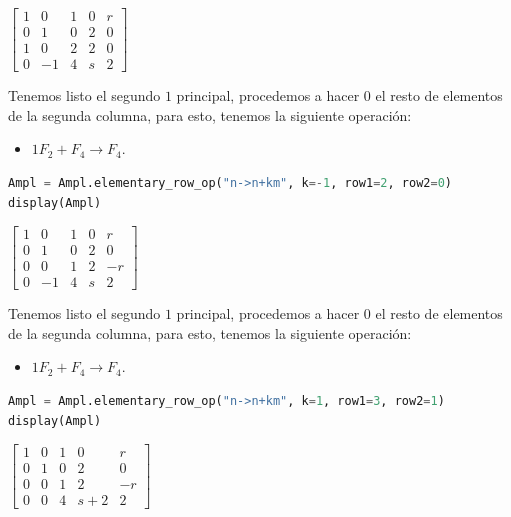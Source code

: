 \documentclass[12pt,a4]{aleph-examen}
\begin{document}
\begin{preguntas}
\begin{respuesta}
\begin{pycodigo}
\begin{ipynbsalida}[2mm]
    $\displaystyle \left[\begin{matrix}1 & 0 & 1 & 0 & r\\0 & 1 & 0 & 2 & 0\\1 & 0 & 2 & 2 & 0\\0 & -1 & 4 & s & 2\end{matrix}\right]$
    \end{ipynbsalida}
\end{pycodigo}
    
Tenemos listo el segundo \(1\) principal, procedemos a hacer \(0\) el
resto de elementos de la segunda columna, para esto, tenemos la
siguiente operación:
\begin{itemize}
    \item \(1F_2+F_4\to F_4\).
\end{itemize}
\begin{pycodigo}
    \begin{ipynbcodigo}\begin{lstlisting}[language=Python]
Ampl = Ampl.elementary_row_op("n->n+km", k=-1, row1=2, row2=0)
display(Ampl)
    \end{lstlisting}\end{ipynbcodigo}
    \begin{ipynbsalida}[2mm]
    $\displaystyle \left[\begin{matrix}1 & 0 & 1 & 0 & r\\0 & 1 & 0 & 2 & 0\\0 & 0 & 1 & 2 & - r\\0 & -1 & 4 & s & 2\end{matrix}\right]$
    \end{ipynbsalida}
\end{pycodigo}

Tenemos listo el segundo \(1\) principal, procedemos a hacer \(0\) el
resto de elementos de la segunda columna, para esto, tenemos la
siguiente operación: 
\begin{itemize}
    \item \(1F_2+F_4\to F_4\).
\end{itemize}
\begin{pycodigo}
    \begin{ipynbcodigo}\begin{lstlisting}[language=Python]
Ampl = Ampl.elementary_row_op("n->n+km", k=1, row1=3, row2=1)
display(Ampl)
    \end{lstlisting}\end{ipynbcodigo}
    \begin{ipynbsalida}[2mm]
    $\displaystyle \left[\begin{matrix}1 & 0 & 1 & 0 & r\\0 & 1 & 0 & 2 & 0\\0 & 0 & 1 & 2 & - r\\0 & 0 & 4 & s + 2 & 2\end{matrix}\right]$
    \end{ipynbsalida}
\end{pycodigo}


\end{respuesta}
\end{preguntas}
\end{document}
